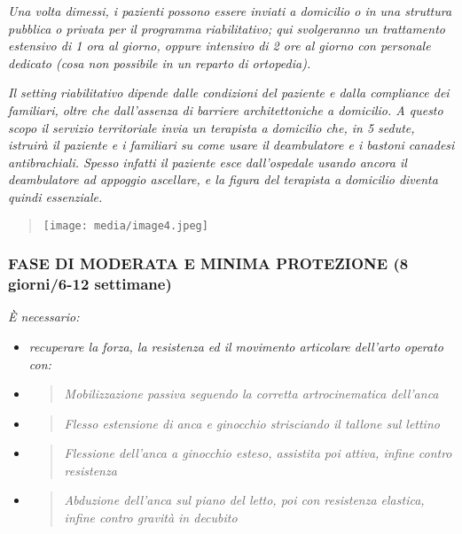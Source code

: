 \documentclass[]{article}
\begin{document}
\emph{Una volta dimessi, i pazienti possono essere inviati a domicilio o
in una struttura pubblica o privata per il programma riabilitativo; qui
svolgeranno un trattamento estensivo di 1 ora al giorno, oppure
intensivo di 2 ore al giorno con personale dedicato (cosa non possibile
in un reparto di ortopedia).}

\emph{Il setting riabilitativo dipende dalle condizioni del paziente e
dalla compliance dei familiari, oltre che dall'assenza di barriere
architettoniche a domicilio. A questo scopo il servizio territoriale
invia un terapista a domicilio che, in 5 sedute, istruirà il paziente e
i familiari su come usare il deambulatore e i bastoni canadesi
antibrachiali. Spesso infatti il paziente esce dall'ospedale usando
ancora il deambulatore ad appoggio ascellare, e la figura del terapista
a domicilio diventa quindi essenziale.}

\begin{quote}
\texttt{[image: media/image4.jpeg]}
\end{quote}

\subsubsection{FASE DI MODERATA E MINIMA PROTEZIONE (8 giorni/6-12
settimane)}\label{fase-di-moderata-e-minima-protezione-8-giorni6-12-settimane}

\emph{È necessario:}

\begin{itemize}
\item
  \emph{recuperare la forza, la resistenza ed il movimento articolare
  dell'arto operato con:}
\end{itemize}

\begin{itemize}
\item
  \begin{quote}
  \emph{Mobilizzazione passiva seguendo la corretta artrocinematica
  dell'anca}
  \end{quote}
\item
  \begin{quote}
  \emph{Flesso estensione di anca e ginocchio strisciando il tallone sul
  lettino}
  \end{quote}
\item
  \begin{quote}
  \emph{Flessione dell'anca a ginocchio esteso, assistita poi attiva,
  infine contro resistenza}
  \end{quote}
\item
  \begin{quote}
  \emph{Abduzione dell'anca sul piano del letto, poi con resistenza
  elastica, infine contro gravità in decubito}
  \end{quote}
\end{itemize}
\end{document}
